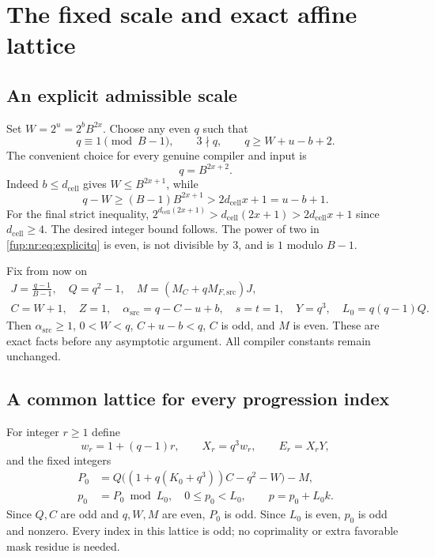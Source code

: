 \documentclass[11pt,letterpaper]{article}
\theoremstyle{definition}\newtheorem{definition}[theorem]{Definition}
\theoremstyle{remark}\newtheorem{remark}[theorem]{Remark}
\newcommand{\MC}{M_C}
\newcommand{\dcell}{d_{\mathrm{cell}}}
\newcommand{\MFsrcV}{M_{F,\mathrm{src}}}
\begin{document}
\section{The fixed scale and exact affine lattice}\label{fup:nr:sec:lattice}
\subsection{An explicit admissible scale}
Set $W=2^u=2^bB^{2x}$. Choose any even $q$ such that
\begin{equation}\label{fup:nr:eq:qchoice}
 q\equiv1\pmod{B-1},\qquad 3\nmid q,\qquad q\ge W+u-b+2.
\end{equation}
The convenient choice for every genuine compiler and input is
\begin{equation}\label{fup:nr:eq:explicitq}
 q=B^{2x+2}.
\end{equation}
Indeed $b\le\dcell$ gives $W\le B^{2x+1}$, while
\[
 q-W\ge(B-1)B^{2x+1}>2\dcell x+1=u-b+1.
\]
For the final strict inequality, $2^{\dcell(2x+1)}>\dcell(2x+1)>2\dcell x+1$ since $\dcell\ge4$. The desired integer bound follows. The power of two in \eqref{fup:nr:eq:explicitq} is even, is not divisible by $3$, and is $1$ modulo $B-1$.

Fix from now on
\begin{equation}\label{fup:nr:eq:fixed}
 \begin{gathered}
 J=\frac{q-1}{B-1},\quad Q=q^2-1,\quad M=(\MC+q\MFsrcV)J,\\
 C=W+1,\quad Z=1,\quad \alpha_{\mathrm{src}}=q-C-u+b,\quad
 s=t=1,\quad Y=q^3,\quad L_0=q(q-1)Q.
 \end{gathered}
\end{equation}
Then $\alpha_{\mathrm{src}}\ge1$, $0<W<q$, $C+u-b<q$, $C$ is odd, and $M$ is even. These are exact facts before any asymptotic argument. All compiler constants remain unchanged.

\subsection{A common lattice for every progression index}
For integer $r\ge1$ define
\begin{equation}\label{fup:nr:eq:progression}
 w_r=1+(q-1)r,\qquad X_r=q^3w_r,
 \qquad E_r=X_rY,
\end{equation}
and the fixed integers
\begin{align}\label{fup:nr:eq:lattice}
 P_0&=Q\bigl((1+q(K_0+q^3))C-q^2-W\bigr)-M,\\
 p_0&=P_0\bmod L_0,\quad 0\le p_0<L_0,\qquad p=p_0+L_0 k.\nonumber
\end{align}
Since $Q,C$ are odd and $q,W,M$ are even, $P_0$ is odd. Since $L_0$ is even, $p_0$ is odd and nonzero. Every index in this lattice is odd; no coprimality or extra favorable mask residue is needed.
\end{document}
